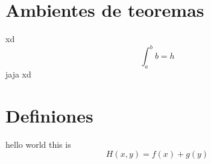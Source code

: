 \section{Ambientes de teoremas}

\begin{theorem}
    xd \lipsum[1] \[\int_a^b b = h\]
    jaja xd
\end{theorem}


\section{Definiones}

\begin{definition}
    hello world this is \[
        H(x,y)  = f(x) + g(y)\]
\end{definition}